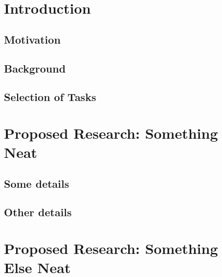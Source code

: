 \noindent

\section{Introduction}
    \label{sec:introduction}
    

    \vspace{0.5em}
    \subsection{Motivation}
        \label{sec:motivation}
        

    \vspace{0.5em}
    \subsection{Background}
        \label{sec:background}
        

    \vspace{0.5em}
    \subsection{Selection of Tasks}
        \label{sec:selectedtasks}
        


\section{Proposed Research: Something Neat}
    \label{sec:neat}
    

    \vspace{0.5em}
    \subsection{Some details}
        \label{sec:somedetails}
        \lipsum[41-50]

    \vspace{0.5em}
    \subsection{Other details}
        \label{sec:otherdetails}
        \lipsum[51-60]


\section{Proposed Research: Something Else Neat}
    \label{sec:elseneat}
    

